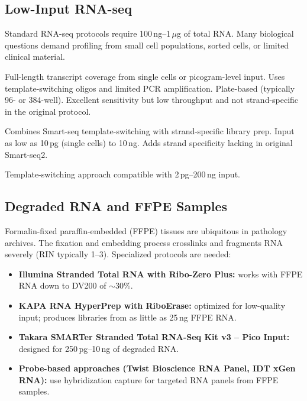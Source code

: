 \subsection{Low-Input RNA-seq}

Standard RNA-seq protocols require 100\,ng--1\,$\mu$g of total RNA. Many
biological questions demand profiling from small cell populations, sorted cells,
or limited clinical material.

\begin{description}[style=nextline]
  \item[Smart-seq2] Full-length transcript coverage from single cells or
    picogram-level input. Uses template-switching oligos and limited PCR
    amplification. Plate-based (typically 96- or 384-well). Excellent
    sensitivity but low throughput and not strand-specific in the original
    protocol.
  \item[SMART-Seq Stranded (Takara)] Combines Smart-seq template-switching
    with strand-specific library prep. Input as low as 10\,pg (single cells)
    to 10\,ng. Adds strand specificity lacking in original Smart-seq2.
  \item[NEBNext Single Cell / Low Input RNA Library Prep] Template-switching
    approach compatible with 2\,pg--200\,ng input.
\end{description}

\subsection{Degraded RNA and FFPE Samples}

Formalin-fixed paraffin-embedded (FFPE) tissues are ubiquitous in pathology
archives. The fixation and embedding process crosslinks and fragments RNA
severely (RIN typically 1--3). Specialized protocols are needed:

\begin{itemize}[nosep]
  \item \textbf{Illumina Stranded Total RNA with Ribo-Zero Plus:} works with
    FFPE RNA down to DV200 of $\sim$30\%.
  \item \textbf{KAPA RNA HyperPrep with RiboErase:} optimized for low-quality
    input; produces libraries from as little as 25\,ng FFPE RNA.
  \item \textbf{Takara SMARTer Stranded Total RNA-Seq Kit v3 -- Pico Input:}
    designed for 250\,pg--10\,ng of degraded RNA.
  \item \textbf{Probe-based approaches (Twist Bioscience RNA Panel, IDT xGen
    RNA):} use hybridization capture for targeted RNA panels from FFPE
    samples.
\end{itemize}

